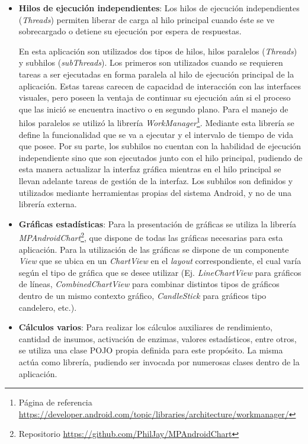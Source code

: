 \begin{itemize}
        \item \textbf{Hilos de ejecución independientes}: Los hilos de ejecución independientes (\textit{Threads}) permiten liberar de carga al hilo principal cuando éste se ve sobrecargado o detiene su ejecución por espera de respuestas. 
        
        \par En esta aplicación son utilizados dos tipos de hilos, hilos paralelos (\textit{Threads}) y subhilos (\textit{subThreads}). Los primeros son utilizados cuando se requieren tareas a ser ejecutadas en forma paralela al hilo de ejecución principal de la aplicación. Estas tareas carecen de capacidad de interacción con las interfaces visuales, pero poseen la ventaja de continuar su ejecución aún si el proceso que las inició se encuentra inactivo o en segundo plano. Para el manejo de hilos paralelos se utilizó la librería \textit{WorkManager}\footnote{Página de referencia \url{https://developer.android.com/topic/libraries/architecture/workmanager/}}. Mediante esta librería se define la funcionalidad que se va a ejecutar y el intervalo de tiempo de vida que posee. Por su parte, los subhilos no cuentan con la habilidad de ejecución independiente sino que son ejecutados junto con el hilo principal, pudiendo de esta manera actualizar la interfaz gráfica mientras en el hilo principal se llevan adelante tareas de gestión de la interfaz. Los subhilos son definidos y utilizados mediante herramientas propias del sistema Android, y no de una librería externa.
        
        \item \textbf{Gráficas estadísticas}: Para la presentación de gráficas se utiliza la librería \textit{MPAndroidChart}\footnote{Repositorio \url{https://github.com/PhilJay/MPAndroidChart}}, que dispone de todas las gráficas necesarias para esta aplicación. Para la utilización de las gráficas se dispone de un componente \textit{View} que se ubica en un \textit{ChartView} en el \textit{layout} correspondiente, el cual varía según el tipo de gráfica que se desee utilizar (Ej. \textit{LineChartView} para gráficos de líneas, \textit{CombinedChartView} para combinar distintos tipos de gráficos dentro de un mismo contexto gráfico, \textit{CandleStick} para gráficos tipo candelero, etc.).
        
        \item \textbf{Cálculos varios}: Para realizar los cálculos auxiliares de rendimiento, cantidad de insumos, activación de enzimas, valores estadísticos, entre otros, se utiliza una clase POJO propia definida para este propósito. La misma actúa como librería, pudiendo ser invocada por numerosas clases dentro de la aplicación.
        
     \end{itemize}
     
